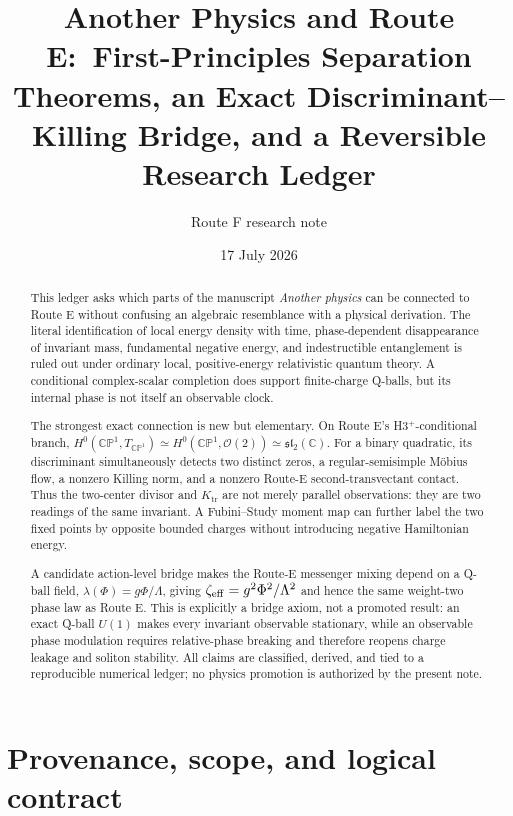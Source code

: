 \documentclass[11pt]{article}
\title{Another Physics and Route E:\
First-Principles Separation Theorems, an Exact
Discriminant--Killing Bridge, and a Reversible Research Ledger}
\author{Route F research note}
\date{17 July 2026}
\numberwithin{equation}{section}
\newcommand{\CP}{\mathbb{CP}}
\newcommand{\cO}{\mathcal O}
\newcommand{\sltwo}{\mathfrak{sl}_2(\mathbb C)}
\newcommand{\Ktr}{K_{\mathrm{tr}}}
\begin{document}
\maketitle

\begin{abstract}
This ledger asks which parts of the manuscript \emph{Another physics} can be
connected to Route E without confusing an algebraic resemblance with a
physical derivation.  The literal identification of local energy density with
time, phase-dependent disappearance of invariant mass, fundamental negative
energy, and indestructible entanglement is ruled out under ordinary local,
positive-energy relativistic quantum theory.  A conditional complex-scalar
completion does support finite-charge Q-balls, but its internal phase is not
itself an observable clock.

The strongest exact connection is new but elementary.  On Route E's
H3$^+$-conditional branch,
\(H^0(\CP^1,T_{\CP^1})\simeq H^0(\CP^1,\cO(2))\simeq\sltwo\).
For a binary quadratic, its discriminant simultaneously detects two distinct
zeros, a regular-semisimple M\"obius flow, a nonzero Killing norm, and a
nonzero Route-E second-transvectant contact.  Thus the two-center divisor and
\(\Ktr\) are not merely parallel observations: they are two readings of the
same invariant.  A Fubini--Study moment map can further label the two fixed
points by opposite bounded charges without introducing negative Hamiltonian
energy.

A candidate action-level bridge makes the Route-E messenger mixing depend on
a Q-ball field, \(\lambda(\Phi)=g\Phi/\Lambda\), giving
\(\zeta_{\rm eff}=g^2\Phi^2/\Lambda^2\) and hence the same weight-two phase
law as Route E.  This is explicitly a bridge axiom, not a promoted result: an
exact Q-ball \(U(1)\) makes every invariant observable stationary, while an
observable phase modulation requires relative-phase breaking and therefore
reopens charge leakage and soliton stability.  All claims are classified,
derived, and tied to a reproducible numerical ledger; no physics promotion is
authorized by the present note.
\end{abstract}

\tableofcontents

\section{Provenance, scope, and logical contract}
\end{document}

